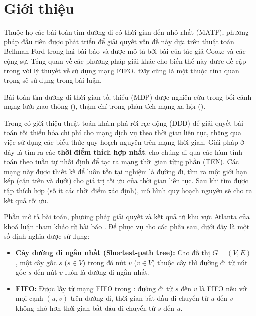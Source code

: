 \documentclass[../main.tex]{subfiles}
\begin{document}
\chapter{Giới thiệu}\label{introduce}


Thuộc họ các bài toán tìm đường đi có thời gian đến nhỏ nhất (MATP), phương pháp đầu
tiên được phát triển để giải quyết vấn đề này dựa trên thuật toán
Bellman-Ford trong hai bài báo \cite{bellman1958routing,ford2010flows} và được mô tả bởi
bài \cite{cooke1966shortest} của tác giả Cooke và các cộng sự. Tổng quan về các phương pháp giải khác cho biến thể
này được đề cập trong \cite{dean2004shortest} với lý thuyết về sử dụng mạng FIFO. Đây cũng là một thuộc tính quan trọng sẽ sử dụng trong bài luận.

Bài toán tìm đường đi thời gian tối thiểu (MDP) được nghiên cứu trong bối cảnh mạng lưới giao thông (\cite{demiryurek2011online}), thậm chí trong phân tích mạng xã hội (\cite{gunturi2012information}).

Trong \cite{boland2017continuous} có giới thiệu thuật toán khám phá rời rạc động (DDD) để giải quyết bài
toán tối thiểu hóa chi phí cho mạng dịch vụ theo thời gian liên tục,
thông qua việc sử dụng các biểu thức quy hoạch nguyên trên mạng thời
gian. Giải pháp ở đây là tìm ra các \textbf{thời điểm thích hợp nhất},
cho chúng đi qua các hàm tính toán theo tuần tự nhất định để tạo ra mạng
thời gian từng phần (TEN). Các mạng này được thiết kế để luôn tồn tại nghiệm là đường đi, tìm
ra một giới hạn kép (cận trên và dưới) cho giá trị tối ưu của thời gian
liên tục. Sau khi tìm được tập thích hợp (số ít các thời điểm xác định), mô hình
quy hoạch nguyên sẽ cho ra kết quả tối ưu.


Phần mô tả bài toán, phương pháp giải quyết và kết quả từ khu vực Atlanta của khoá luận 
tham khảo từ bài báo \cite{he2022dynamic}.
Để phục vụ cho các phần sau, dưới đây là một số định nghĩa được sử dụng: 
\begin{itemize}
  \item \textbf{Cây đường đi ngắn
nhất (Shortest-path tree):} Cho đồ thị \(G=(V,E)\), một cây gốc \(s\)
(\(s\in V\)) trong đó nút \(v\) (\(v\in V\)) thuộc cây thì đường đi từ
nút gốc \(s\) đến nút \(v\) luôn là đường đi ngắn nhất.
  \item \textbf{FIFO:} 
  Được lấy từ mạng FIFO trong \cite{dean2004shortest}: 
  đường đi từ \(s\) đến \(v\) là FIFO nếu với mọi cạnh \((u, v)\) trên đường đi, 
  thời gian bắt đầu di chuyển từ \(u\) đến \(v\) không nhỏ hơn thời gian bắt đầu di chuyển 
  từ \(s\) đến \(u\).
\end{itemize}
\end{document}
